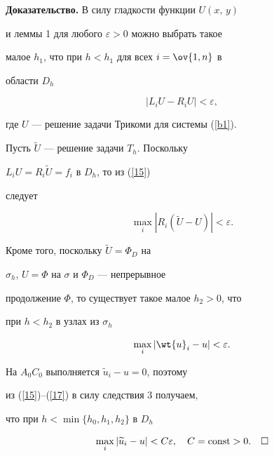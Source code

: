 {\bf Доказательство.} В силу гладкости функции $U(x,\,y)$


и леммы 1 для любого $\varepsilon > 0$ можно выбрать такое


малое $h_1$, что при $h<h_1$ для всех $i=\ov{1,n}$ в


области $D_h$


\begin{equation}\label{15}


|L_iU - R_iU|< \varepsilon,


\end{equation}


где $U$ --- решение задачи Трикоми для системы (\ref{b1}).


Пусть $\widetilde{U}$ --- решение задачи $T_h$. Поскольку


$L_iU= R_i\widetilde{U} = f_i$ в $D_h$, то из (\ref{15})


следует


\begin{equation}\label{16}


\max_i|R_i(\widetilde{U} - U)| < \varepsilon.


\end{equation}





Кроме того, поскольку $\widetilde{U} = \Phi_D$ на


$\sigma_h$, $U=\Phi$ на $\sigma$ и $\Phi_D$ --- непрерывное


продолжение $\Phi$, то существует такое малое $h_2>0$, что


при $h < h_2$ в узлах из $\sigma_h$


\begin{equation}\label{17}


\max_i|\wt{u}_i - u| < \varepsilon.


\end{equation}





На $A_0C_0$ выполняется $\widetilde{u}_i - u = 0$, поэтому


из (\ref{15})--(\ref{17}) в силу следствия 3 получаем,


что при $h <\min \{h_0,h_1,h_2 \}$ в $D_h$


$$


\max_i|\widetilde{u}_i - u| < C\varepsilon,\quad C=\const>0.\quad\square


$$








